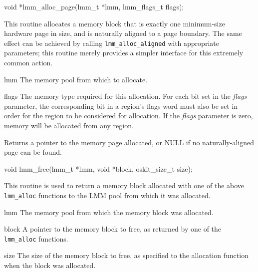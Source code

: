 \label{lmm-alloc-page}
\begin{apisyn}

	\funcproto void *lmm_alloc_page(lmm_t *lmm, lmm_flags_t flags);
\end{apisyn}
\begin{apidesc}
	This routine allocates a memory block
	that is exactly one minimum-size hardware page in size,
	and is naturally aligned to a page boundary.
	The same effect can be achieved
	by calling {\tt lmm_alloc_aligned} with appropriate parameters;
	this routine merely provides a simpler interface
	for this extremely common action.
\end{apidesc}
\begin{apiparm}
	\item[lmm]
		The memory pool from which to allocate.
	\item[flags]
		The memory type required for this allocation.
		For each bit set in the \emph{flags} parameter,
		the corresponding bit in a region's flags word must also be set
		in order for the region to be considered for allocation.
		If the \emph{flags} parameter is zero,
		memory will be allocated from any region.
\end{apiparm}
\begin{apiret}
	Returns a pointer to the memory page allocated,
	or NULL if no naturally-aligned page can be found.
\end{apiret}

\label{lmm-free}
\begin{apisyn}

	\funcproto void lmm_free(lmm_t *lmm, void *block, oskit_size_t size);
\end{apisyn}
\begin{apidesc}
	This routine is used to return a memory block
	allocated with one of the above {\tt lmm_alloc} functions
	to the LMM pool from which it was allocated.
\end{apidesc}
\begin{apiparm}
	\item[lmm]
		The memory pool from which the memory block was allocated.
	\item[block]
		A pointer to the memory block to free,
		as returned by one of the {\tt lmm_alloc} functions.
	\item[size]
		The size of the memory block to free,
		as specified to the allocation function
		when the block was allocated.
\end{apiparm}

